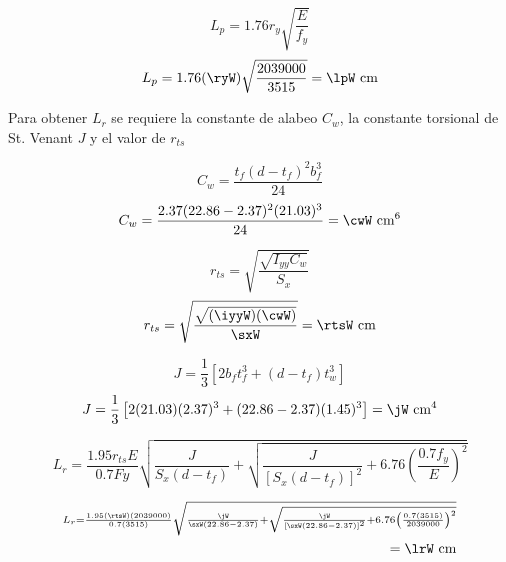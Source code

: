 \documentclass[11pt,a4paper]{article}
\begin{document}
\begin{equation}
	L_p=1.76r_y\sqrt{\frac{E}{f_y}} 
\end{equation}
\begin{align*}
	L_p=1.76(\ryW)\sqrt{\frac{\Ey}{\fy}} =\lpW \text{ cm}
\end{align*}

Para obtener $L_r$ se requiere la constante de alabeo $C_w$, la constante torsional de St. Venant  $J$ y el valor de $r_{ts}$

\begin{equation}
	C_w=\frac{t_f(d-t_f)^2b_f^3}{24} 
\end{equation}
\begin{align*}
	C_w=\frac{\tfW(\dW-\tfW)^2(\bfW)^3}{24}  =\cwW \text{ cm$^6$}
\end{align*}

\begin{equation}
	r_{ts}=\sqrt{\frac{\sqrt{I_{yy}C_w}}{S_x}}
\end{equation}
\begin{align*}
	r_{ts}=\sqrt{\frac{\sqrt{(\iyyW)(\cwW)}}{\sxW}}= \rtsW\text{ cm}
\end{align*}

\begin{equation}
	J=\frac{1}{3}\left[2b_ft_{f}^{3}+(d-t_f)t_w^3 \right]
\end{equation}
\begin{align*}
	J=\frac{1}{3}\left[2(\bfW)(\tfW)^{3}+(\dW-\tfW)(\twW)^3 \right]= \jW\text{ cm$^4$}
\end{align*}

\begin{equation}
	L_r=\frac{1.95r_{ts}E}{0.7Fy}\sqrt{\frac{J}{S_x(d-t_f)}+\sqrt{\frac{J}{[S_x(d-t_f)]^2}+6.76\left(\frac{0.7f_y}{E}\right)^2}}
\end{equation}

\begin{align*}
	 \scriptstyle L_r=\frac{1.95(\rtsW)(\Ey)}{0.7(\fy)}\sqrt{\frac{\jW}{\sxW(\dW-\tfW)}+\sqrt{\frac{\jW}{[\sxW(\dW-\tfW)]^2}+6.76\left(\frac{0.7(\fy)}{\Ey}\right)^2}}\\
	=\lrW\text{ cm}
\end{align*}
\end{document}
